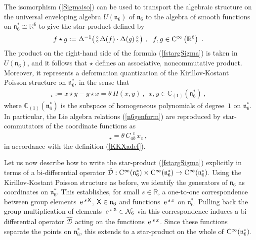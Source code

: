 \documentclass[11pt,a4paper]{article}
\newcommand{\NO}{\mbox{$\substack{\circ\\\circ}$}}      %
\def\CC{{\rm C}}
\def\X{{\sf X}}
\def\mfn{{\mathfrak n}}
\newcommand{\complex}{{\mathbb C}} %
\newcommand{\real}{{\mathbb R}} %
\def\e{{\,\rm e}\,}
\newcommand{\beq}{\begin{eqnarray}}
\newcommand{\eeq}{\end{eqnarray}}
\begin{document}
The isomorphism (\ref{Sigmaiso}) can be used to transport the
algebraic structure on the universal enveloping algebra $U(\mfn_6)$ of
$\mfn_6$ to the algebra of smooth functions on $\mfn_6^*\cong\real^6$
to give the star-product defined by
\beq
f\star g:=\Delta^{-1}\bigl(\,\NO\,\Delta(f)\cdot\Delta(g)\,\NO
\,\bigr) \ , ~~ f,g\in\CC^\infty\left(\real^6\right) \ .
\label{fstargSigma}\eeq
The product on the right-hand side of the formula (\ref{fstargSigma})
is taken in $U(\mfn_6)$, and it follows that $\star$ defines an
associative, noncommutative product. Moreover, it represents a
deformation quantization of the Kirillov-Kostant Poisson structure on
$\mfn_6^*$, in the sense that
\beq
[x,y]_\star:=x\star y-y\star x=\theta\,\Pi(x,y) \ , ~~ x,y\in\complex_{(1)}
\left(\mfn_6^*\right) \ ,
\label{xyPoisson}\eeq
where $\complex_{(1)}(\mfn_6^*)$ is the subspace of homogeneous
polynomials of degree~$1$ on $\mfn_6^*$. In particular, the Lie
algebra relations (\ref{n6genform}) are reproduced by star-commutators
of the coordinate functions as
\beq
[x_a,x_b]_\star=\theta\,C_{ab}^{~~c}\,x_c \ ,
\label{xaxbstarcomm}\eeq
in accordance with the definition (\ref{KKXadef}).

Let us now describe how to write the star-product (\ref{fstargSigma})
explicitly in terms of a bi-differential operator
$\hat{\mathcal{D}}:\CC^\infty(\mfn_6^*)\times\CC^\infty(\mfn_6^*)\to
\CC^\infty(\mfn_6^*)$. Using the Kirillov-Kostant Poisson structure as
before, we identify the generators of $\mfn_6$ as coordinates on
$\mfn_6^*$. This establishes, for small $s\in\real$, a one-to-one
correspondence between group elements $\e^{s\,\X}$, $\X\in\mfn_6$ and
functions $\e^{s\,x}$ on $\mfn_6^*$. Pulling back the group
multiplication of elements $\e^{s\,\X}\in\mathcal{N}_6$ via this
correspondence induces a bi-differential operator $\hat{\mathcal{D}}$
acting on the functions $\e^{s\,x}$. Since these functions separate
the points on $\mfn_6^*$, this extends to a star-product on the whole
of $\CC^\infty(\mfn_6^*)$.
\end{document}
